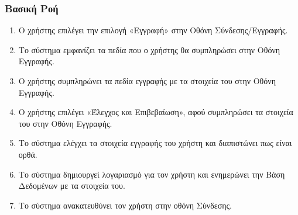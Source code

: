 \documentclass[12pt,a4paper,twoside]{book}
\begin{document}
\subsubsection{Βασική Ροή}
\begin{enumerate}
  \item Ο χρήστης επιλέγει την επιλογή «Εγγραφή» στην Οθόνη Σύνδεσης/Εγγραφής.  %
  \item Το σύστημα εμφανίζει τα πεδία που ο χρήστης θα συμπληρώσει στην Οθόνη Εγγραφής. %
  \item Ο χρήστης συμπληρώνει τα πεδία εγγραφής με τα στοιχεία του στην Οθόνη Εγγραφής. %
  \item Ο χρήστης επιλέγει «Έλεγχος και Επιβεβαίωση», αφού συμπληρώσει τα στοιχεία του στην Οθόνη Εγγραφής. %
  \item Το σύστημα ελέγχει τα στοιχεία εγγραφής του χρήστη και διαπιστώνει πως είναι ορθά.  %
  \item Το σύστημα δημιουργεί λογαριασμό για τον χρήστη και ενημερώνει την Βάση Δεδομένων με τα στοιχεία του. %
  \item Το σύστημα ανακατευθύνει τον χρήστη στην οθόνη Σύνδεσης. %
\end{enumerate}
\end{document}
